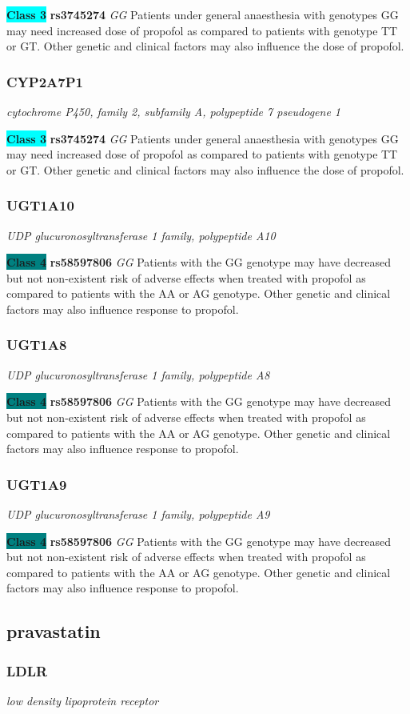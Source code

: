 \documentclass{report}
\begin{document}
\textbf{\colorbox{cyan} {Class 3}} \textbf{ rs3745274 } \textit{ GG }
Patients under general anaesthesia with genotypes GG may need increased dose of propofol as compared to patients with genotype TT or GT. Other genetic and clinical factors may also influence the dose of propofol. \newline\subsubsection{ CYP2A7P1 }
\textit{ cytochrome P450, family 2, subfamily A, polypeptide 7 pseudogene 1 }

\textbf{\colorbox{cyan} {Class 3}} \textbf{ rs3745274 } \textit{ GG }
Patients under general anaesthesia with genotypes GG may need increased dose of propofol as compared to patients with genotype TT or GT. Other genetic and clinical factors may also influence the dose of propofol. \newline\subsubsection{ UGT1A10 }
\textit{ UDP glucuronosyltransferase 1 family, polypeptide A10 }

\textbf{\colorbox{teal} {Class 4}} \textbf{ rs58597806 } \textit{ GG }
Patients with the GG genotype may have decreased but not non-existent risk of adverse effects when treated with propofol as compared to patients with the AA or AG genotype. Other genetic and clinical factors may also influence response to propofol.\newline\subsubsection{ UGT1A8 }
\textit{ UDP glucuronosyltransferase 1 family, polypeptide A8 }

\textbf{\colorbox{teal} {Class 4}} \textbf{ rs58597806 } \textit{ GG }
Patients with the GG genotype may have decreased but not non-existent risk of adverse effects when treated with propofol as compared to patients with the AA or AG genotype. Other genetic and clinical factors may also influence response to propofol.\newline\subsubsection{ UGT1A9 }
\textit{ UDP glucuronosyltransferase 1 family, polypeptide A9 }

\textbf{\colorbox{teal} {Class 4}} \textbf{ rs58597806 } \textit{ GG }
Patients with the GG genotype may have decreased but not non-existent risk of adverse effects when treated with propofol as compared to patients with the AA or AG genotype. Other genetic and clinical factors may also influence response to propofol.\newline\subsection{ pravastatin }\subsubsection{ LDLR }
\textit{ low density lipoprotein receptor }
\end{document}
